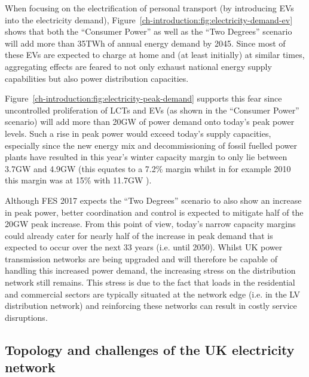 

When focusing on the electrification of personal transport (by introducing EVs into the electricity demand), Figure~\ref{ch-introduction:fig:electricity-demand-ev} shows that both the ``Consumer Power'' as well as the ``Two Degrees'' scenario will add more than 35TWh of annual energy demand by 2045.
Since most of these EVs are expected to charge at home and (at least initially) at similar times, aggregating effects are feared to not only exhaust national energy supply capabilities but also power distribution capacities.




Figure~\ref{ch-introduction:fig:electricity-peak-demand} supports this fear since uncontrolled proliferation of LCTs and EVs (as shown in the ``Consumer Power'' scenario) will add more than 20GW of power demand onto today's peak power levels.
Such a rise in peak power would exceed today's supply capacities, especially since the new energy mix and decommissioning of fossil fuelled power plants have resulted in this year's winter capacity margin to only lie between 3.7GW and 4.9GW \cite{NationalGrid2017a} (this equates to a 7.2\% margin whilst in for example 2010 this margin was at 15\% with 11.7GW \cite{NationalGrid2010}).

Although FES 2017 expects the ``Two Degrees'' scenario to also show an increase in peak power, better coordination and control is expected to mitigate half of the 20GW peak increase.
From this point of view, today's narrow capacity margins could already cater for nearly half of the increase in peak demand that is expected to occur over the next 33 years (i.e. until 2050).
Whilst UK power transmission networks are being upgraded and will therefore be capable of handling this increased power demand, the increasing stress on the distribution network still remains.
This stress is due to the fact that loads in the residential and commercial sectors are typically situated at the network edge (i.e. in the LV distribution network) and reinforcing these networks can result in costly service disruptions.

\subsection{Topology and challenges of the UK electricity network}
\label{ch-introduction:subsec:topology-of-lv-network}

